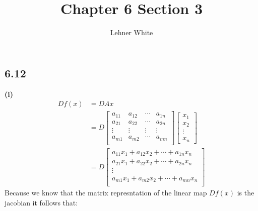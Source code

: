 \documentclass[letterpaper,12pt]{article}
\theoremstyle{definition}
\begin{document}
\title{Chapter 6 Section 3}
\author{Lehner White}
\maketitle

\subsection*{6.12}
\textbf{(i)}\\
\begin{align*}
    Df(x) &= DAx \\
    &=
    D\begin{bmatrix}
        a_{11} & a_{12} & \cdots & a_{1n} \\
        a_{21} & a_{22} & \cdots & a_{2n} \\
        \vdots & \vdots & \vdots & \vdots \\
        a_{m1} & a_{m2} & \cdots & a_{mn} \\
    \end{bmatrix}
    \begin{bmatrix}
        x_1 \\x_2 \\ \vdots \\ x_n 
    \end{bmatrix}\\
    &=
    D\begin{bmatrix}
        a_{11}x_1 +  a_{12}x_2 +  \cdots + a_{1n}x_n \\
        a_{21}x_1 + a_{22}x_2 + \cdots + a_{2n}x_n \\
        \vdots \\
        a_{m1}x_1 + a_{m2}x_2 + \cdots + a_{mn}x_n \\
    \end{bmatrix}
\end{align*}
Because we know that the matrix represntation of the linear map $Df(x)$ is the jacobian it follows that:
\end{document}
